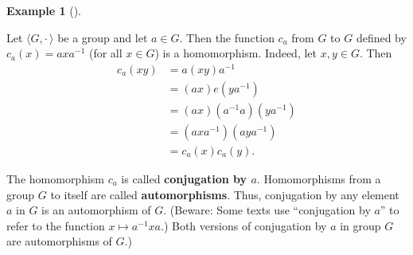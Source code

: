 \documentclass[10pt,]{book}
\newcommand{\terminology}[1]{\textbf{#1}}
\theoremstyle{plain}
\theoremstyle{definition}
\theoremstyle{definition}
\theoremstyle{definition}
\newtheorem{example}[theorem]{Example}
\theoremstyle{definition}
\numberwithin{equation}{section}
\def\Gdot{\langle G, \cdot\,\rangle}
\newcommand{\amp}{ & }
\begin{document}
\begin{example}[]\label{example-27}

        Let \(\Gdot\) be a group and let \(a\in G\). Then the
        function \(c_a\) from \(G\) to \(G\) defined by \(c_a(x)=axa^{-1}\) (for
        all \(x\in G\)) is a homomorphism. Indeed, let \(x,y\in G\). Then
\begin{align*}
c_a(xy)\amp =a(xy)a^{-1}\\
\amp =(ax)e(ya^{-1})\\
\amp =(ax)(a^{-1}a)(ya^{-1})\\
\amp =(axa^{-1})(aya^{-1})\\
\amp =c_a(x)c_a(y).
\end{align*}

\par

        The homomorphism \(c_a\) is called
        \terminology{conjugation by \(a\)}. Homomorphisms from a group \(G\) to
        itself are called \terminology{automorphisms}. Thus, conjugation by any
        element \(a\) in \(G\) is an automorphism of \(G\). (Beware: Some texts use ``conjugation by \(a\)'' to 
        refer to the function \(x\mapsto a^{-1}xa\).) Both versions of conjugation by \(a\) in group \(G\) are
        automorphisms of \(G\).)%
\label{notation-48}
\end{example}
\par
\end{document}
